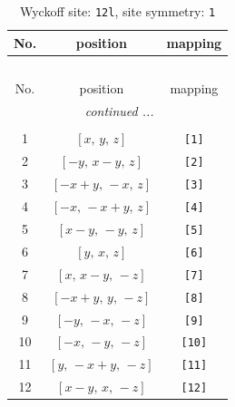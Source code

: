 \documentclass[fleqn,8pt]{jsarticle}
\begin{document}
\begin{longtable}{ccc}
\caption{Wyckoff site: {\tt 12l}, site symmetry: {\tt 1}}
 \\
 \hline \hline
No. & position & mapping \\ \hline \endfirsthead

\multicolumn{2}{l}{\tablename\ \thetable{}} \\
 \hline \hline
No. & position & mapping \\ \hline \endhead

 \hline \hline
\multicolumn{2}{r}{\footnotesize\it continued ...} \\ \endfoot

 \hline \hline
\multicolumn{2}{r}{} \\ \endlastfoot

1 & $\left[ x,\, y,\, z \right]$ & {\tt [1]} \\ \hline
2 & $\left[ - y,\, x - y,\, z \right]$ & {\tt [2]} \\ \hline
3 & $\left[ - x + y,\, - x,\, z \right]$ & {\tt [3]} \\ \hline
4 & $\left[ - x,\, - x + y,\, z \right]$ & {\tt [4]} \\ \hline
5 & $\left[ x - y,\, - y,\, z \right]$ & {\tt [5]} \\ \hline
6 & $\left[ y,\, x,\, z \right]$ & {\tt [6]} \\ \hline
7 & $\left[ x,\, x - y,\, - z \right]$ & {\tt [7]} \\ \hline
8 & $\left[ - x + y,\, y,\, - z \right]$ & {\tt [8]} \\ \hline
9 & $\left[ - y,\, - x,\, - z \right]$ & {\tt [9]} \\ \hline
10 & $\left[ - x,\, - y,\, - z \right]$ & {\tt [10]} \\ \hline
11 & $\left[ y,\, - x + y,\, - z \right]$ & {\tt [11]} \\ \hline
12 & $\left[ x - y,\, x,\, - z \right]$ & {\tt [12]} \\
\end{longtable}
\end{document}
